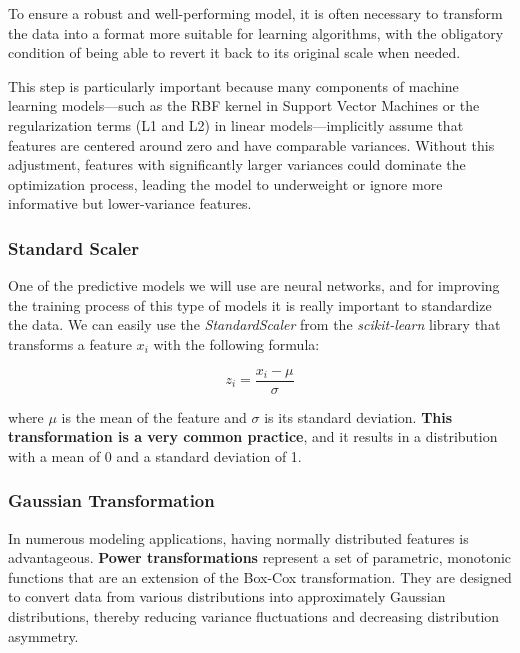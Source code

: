 \documentclass[11pt,english,a4paper,hidelinks]{book}
\begin{document}
To ensure a robust and well-performing model, it is often necessary to transform the data into a format more suitable for learning algorithms, with the obligatory condition of being able to revert it back to its original scale when needed. 

\vspace{0.5cm}
\noindent This step is particularly important because many components of machine learning models—such as the RBF kernel in Support Vector Machines or the regularization terms (L1 and L2) in linear models—implicitly assume that features are centered around zero and have comparable variances. Without this adjustment, features with significantly larger variances could dominate the optimization process, leading the model to underweight or ignore more informative but lower-variance features.

\subsubsection{Standard Scaler}
One of the predictive models we will use are neural networks, and for improving the training process of this type of models it is really important to standardize the data. We can easily use the \textit{StandardScaler} from the \textit{scikit-learn} library that transforms a feature \(x_i\) with the following formula:

\begin{equation}
z_i = \frac{x_i - \mu}{\sigma}
\end{equation}

\noindent where \(\mu\) is the mean of the feature and \(\sigma\) is its standard deviation. \textbf{This transformation is a very common practice}, and it results in a distribution with a mean of 0 and a standard deviation of 1.



\subsubsection{Gaussian Transformation}

In numerous modeling applications, having normally distributed features is advantageous. \textbf{Power transformations} represent a set of parametric, monotonic functions that are an extension of the Box-Cox transformation. They are designed to convert data from various distributions into approximately Gaussian distributions, thereby reducing variance fluctuations and decreasing distribution asymmetry. 
\end{document}
